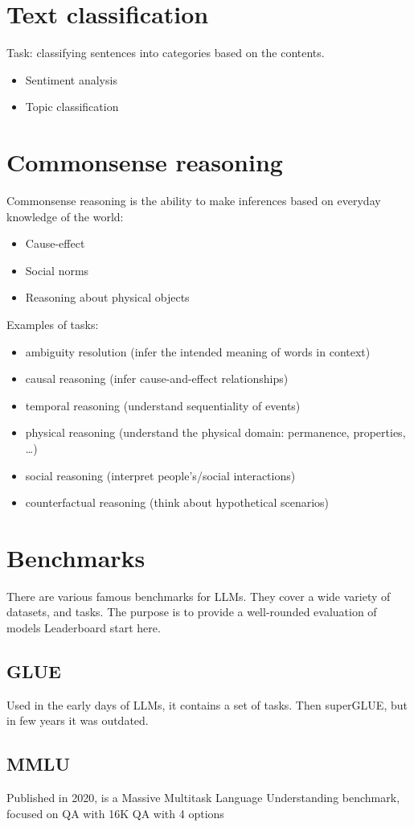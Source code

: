 \section{Text classification}

Task: classifying sentences into categories based on the contents.

\begin{itemize}
  \item Sentiment analysis
  \item Topic classification
\end{itemize}

\section{Commonsense reasoning}
Commonsense reasoning is the ability to make inferences based on
everyday knowledge of the world:

\begin{itemize}
  \item Cause-effect
  \item Social norms
  \item Reasoning about physical objects
\end{itemize}

Examples of tasks:

\begin{itemize}
  \item ambiguity resolution (infer the intended meaning of words in context)
  \item causal reasoning (infer cause-and-effect relationships)
  \item temporal reasoning (understand sequentiality of events)
  \item physical reasoning (understand the physical domain: permanence, properties, …)
  \item social reasoning (interpret people's/social interactions)
  \item counterfactual reasoning (think about hypothetical scenarios)
\end{itemize}


\section{Benchmarks}
There are various famous benchmarks for LLMs. They cover a wide variety of datasets, and tasks. The purpose is to provide a well-rounded evaluation of models
Leaderboard start here.

\subsection{GLUE}
Used in the early days of LLMs, it contains a set of tasks.
Then superGLUE, but in few years it was outdated.

\subsection{MMLU}
Published in 2020, is a Massive Multitask Language Understanding benchmark, focused on QA with 16K QA with 4 options







